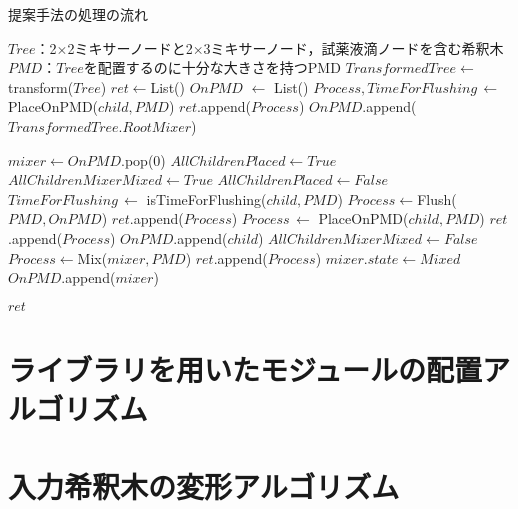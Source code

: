 \begin{algorithm}[tbp]
 \caption{提案手法の処理の流れ}\label{alg:prop}
 \begin{algorithmic}[1]
     \Require $\mathit{Tree}$：2$\times$2ミキサーノードと2$\times$3ミキサーノード，試薬液滴ノードを含む希釈木 
     \Require $\mathit{PMD}$：$\mathit{Tree}$を配置するのに十分な大きさを持つPMD  
     \State $\mathit{TransformedTree} \gets$ transform($Tree$) \label{transform_pseudo}
     \State $\mathit{ret} \gets $List() \label{xntm_pseudo}
     \State $\mathit{OnPMD}$ $\gets$ List() \label{xntm}
     \State $\mathit{Process,TimeForFlushing}\,\gets $  PlaceOnPMD($\mathit{child,PMD}$)
     \State $\mathit{ret}$.append($\mathit{Process}$)
     \State $\mathit{OnPMD}$.append($TransformedTree.RootMixer$)
    
    \State {}
        \State$\mathit{mixer} \gets  \mathit{OnPMD}$.pop(0)
        \State $\mathit{AllChildrenPlaced}\gets\mathit{True}$
        \State $\mathit{AllChildrenMixerMixed}\gets\mathit{True}$
                \State$\mathit{AllChildrenPlaced \gets False}$
                \State $\mathit{TimeForFlushing}\, \gets$  isTimeForFlushing($\mathit{child,PMD}$) 
                    \State $\mathit{Process}\gets$Flush($\mathit{PMD,OnPMD}$)
                    \State $\mathit{ret}$.append($\mathit{Process}$)
                \EndIf
                \State $\mathit{Process}\, \gets$  PlaceOnPMD($\mathit{child,PMD}$)
                \State $\mathit{ret}$.append($\mathit{Process}$)
                \State $\mathit{OnPMD}$.append($\mathit{child}$) 
            \EndIf 
                \State $\mathit{AllChildrenMixerMixed}\gets\mathit{False}$
            \EndIf 
        \EndFor 
            \State$\mathit{Process}\gets$Mix($\mathit{mixer,PMD}$)
            \State $\mathit{ret}$.append($\mathit{Process}$)
            \State$\mathit{mixer.state} \gets \mathit{Mixed}$ 
        \EndIf
        \State$\mathit{OnPMD}$.append($\mathit{mixer}$)
    \EndWhile 

     \Return $\mathit{ret}$
 \end{algorithmic}
\end{algorithm}

\section{ライブラリを用いたモジュールの配置{アルゴリズム}}
\section{入力希釈木の変形アルゴリズム}



